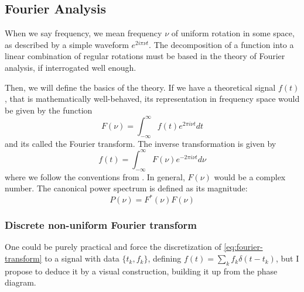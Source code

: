 \subsection{Fourier Analysis}

When we say frequency, we mean frequency $\nu$ of uniform rotation in some space, as described by a simple waveform $e^{2i\pi \nu t}$.
The decomposition of a function into a linear combination of regular rotations must be based in the theory of Fourier analysis,
if interrogated well enough. 

Then, we will define the basics of the theory. If we have a theoretical signal $f(t)$, that is mathematically well-behaved,
its representation in frequency space would be given by the function
\begin{equation}
	F(\nu) = \int_{-\infty}^\infty f(t) e^{2\pi i \nu t} dt \label{eq:fourier-transform}
\end{equation}
and its called the Fourier transform. The inverse transformation is given by 
\begin{equation}
	f(t) = \int_{-\infty}^{\infty} F(\nu) e^{-2\pi i \nu t} d\nu
\end{equation}
where we follow the conventions from \cite{Deeming1975}. In general, $F(\nu)$ would be a complex number.
The canonical power spectrum is defined as its magnitude:
\begin{equation}
	P(\nu) = F^\ast(\nu) F(\nu) \label{eq:conjugate}
\end{equation}


	\subsubsection{Discrete non-uniform Fourier transform}
	
	One could be purely practical and force the discretization of \autoref{eq:fourier-transform} to a signal with data $\{t_k,f_k\}$,
	defining $f(t) = \sum_k f_k \delta(t-t_k)$, but I propose to deduce it by a visual construction, building it up from the phase diagram.
	
